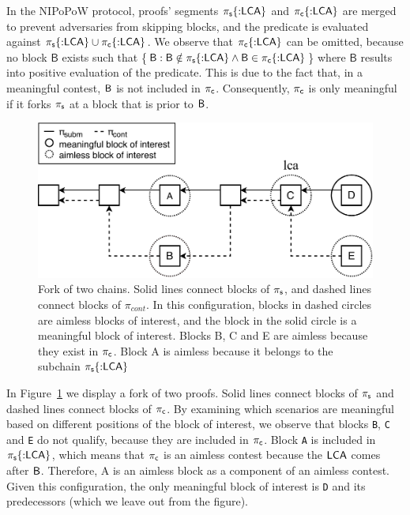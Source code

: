 \newcommand{\block}{\mathsf{B}}

In the NIPoPoW protocol, proofs' segments $\mathsf{\pi_{s}}\{{{:}}\mathsf{LCA}\}$ and
$\mathsf{\pi_{c}}\{{:}\mathsf{LCA}\}$ are merged to prevent adversaries from skipping
blocks, and the predicate is evaluated against $\mathsf{\pi_{s}}\{{:}\mathsf{LCA}\} \cup
\mathsf{\pi_{c}}\{{:}\mathsf{LCA}\}$. We observe that $\mathsf{\pi_{c}}\{{:}\mathsf{LCA}\}$ can be omitted, because no
block $\block$ exists such that \{$\block : \block \notin \pis\{{:}\lca\} \land
\block \in \pic\{{:}\lca\}$\} where $\block$ results into positive evaluation
of the predicate. This is due to the fact that, in a meaningful contest, $\mathsf{B}$
is not included in $\mathsf{\pi_{c}}$. Consequently, $\mathsf{\pi_{c}}$ is only meaningful if it forks
$\mathsf{\pi_{s}}$ at a block that is prior to $\mathsf{B}$.

\renewcommand{\block}{}

\begin{figure}[h]
    \begin{center}
        \includegraphics[width=1\columnwidth]{figures/boi-position.pdf}
    \end{center}
    \caption{Fork of two chains. Solid lines connect blocks of $\mathsf{\pi_{s}}$,
    and dashed lines connect blocks of $\pi_{cont}$. In this configuration,
    blocks in dashed circles are aimless blocks of interest, and the block
    in the solid circle is a meaningful block of interest. Blocks B, C and E are
    aimless because they exist in $\mathsf{\pi_{c}}$. Block A is aimless because it
    belongs to the subchain $\mathsf{\pi_{s}}\{{:}\mathsf{LCA}\}$}
    \label{fig:boi-position}
\end{figure}

In Figure~\ref{fig:boi-position} we display a fork of two proofs. Solid lines
connect blocks of $\mathsf{\pi_{s}}$ and dashed lines connect blocks of $\mathsf{\pi_{c}}$. By
examining which scenarios are meaningful based on different positions of the
block of interest, we observe that blocks \texttt{B}, \texttt{C} and \texttt{E}
do not qualify, because they are included in $\mathsf{\pi_{c}}$. Block \texttt{A} is
included in $\mathsf{\pi_{s}}\{{:}\mathsf{LCA}\}$, which means that $\mathsf{\pi_{c}}$ is an aimless contest
because the $\mathsf{LCA}$ comes after $\mathsf{B}$. Therefore, A is an aimless block as a
component of an aimless contest. Given this configuration, the only meaningful
block of interest is \texttt{D} and its predecessors (which we leave out from
the figure).

